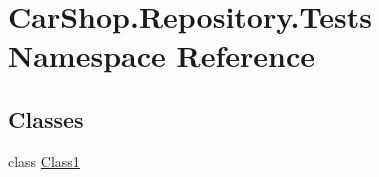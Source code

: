 \hypertarget{namespace_car_shop_1_1_repository_1_1_tests}{}\section{Car\+Shop.\+Repository.\+Tests Namespace Reference}
\label{namespace_car_shop_1_1_repository_1_1_tests}
\subsection*{Classes}
\begin{DoxyCompactItemize}
\item 
class \mbox{\hyperlink{class_car_shop_1_1_repository_1_1_tests_1_1_class1}{Class1}}
\end{DoxyCompactItemize}
